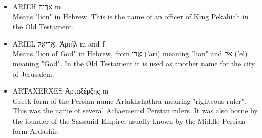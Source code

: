 \begin{itemize}
Meaning unknown, possibly of Persian origin. In the Old Testament this is the name of one of the ten sons of Haman killed by the Jews.
\item {ARIEH אַרְיֵה m}\\
Means "lion" in Hebrew. This is the name of an officer of King Pekahiah in the Old Testament.
\item {ARIEL אֲרִיאֵל, Ἀριήλ m and f}\\
Means "lion of God" in Hebrew, from אֲרִי ('ari) meaning "lion" and אֵל ('el) meaning "God". In the Old Testament it is used as another name for the city of Jerusalem. 
\item {ARTAXERXES Ἀρταξέρξης m}\\
Greek form of the Persian name Artakhshathra meaning "righteous ruler". This was the name of several Achaemenid Persian rulers. It was also borne by the founder of the Sassanid Empire, usually known by the Middle Persian form Ardashir.





\end{itemize}
